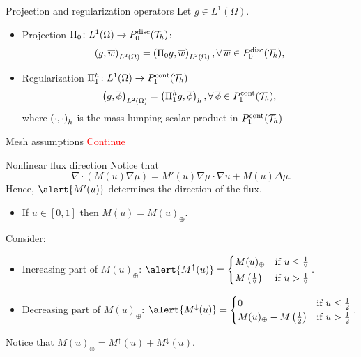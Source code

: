 \begin{frame}{Projection and regularization operators}
	Let $g\in L^1(\Omega)$.

	\begin{itemize}
		\item Projection $\Pi_0\colon L^1(\Omega) \rightarrow \relax{P}^{\text{disc}}_0(\mathcal{T}_h)$:
		\begin{equation*}
			\left(g,\overline{w}\right)_{L^2(\Omega)}=
			\left(\Pi_0 g,\overline{w}\right)_{L^2(\Omega)},\forall\,\overline{w}\in \relax{P}^{\text{disc}}_0(\mathcal{T}_h),
		\end{equation*}
		\item Regularization $\Pi^h_1\colon L^1(\Omega)\rightarrow \relax{P}^{\text{cont}}_1(\mathcal{T}_h)$
		\begin{equation*}
			\left(g,\overline{\phi}\right)_{L^2(\Omega)}=\left(\Pi^h_1 g,\overline{\phi}\right)_h,\forall\,\overline{\phi}\in \relax{P}^{\text{cont}}_1(\mathcal{T}_h),
		\end{equation*}
		where $\left(\cdot,\cdot\right)_h$ is the mass-lumping scalar product in $\relax{P}^{\text{cont}}_1(\mathcal{T}_h)$
	\end{itemize}
\end{frame}

\begin{frame}{Mesh assumptions}
	\textcolor{red}{Continue}
\end{frame}

\begin{frame}{Nonlinear flux direction}
	\footnotesize
	Notice that
	$$\nabla\cdot(M(u)\nabla\mu)=M'(u)\nabla\mu \cdot\nabla u+M(u)\Delta\mu.$$
	Hence, $\alert{M'(u)}$ determines the direction of the flux.
	
	\vspace*{0.3cm}
	\begin{itemize}
		\item If $u\in[0,1]$ then $M(u)=M(u)_\oplus$.
	\end{itemize}
	\vspace*{0.3cm}
	
	Consider:
	\begin{itemize}
		\item Increasing part of $M(u)_\oplus$: $\alert{M^\uparrow(u)}=
		\begin{cases}
			M(u)_{\oplus} & \text{if }u\le \frac{1}{2}\\[0.2em]
			M\left(\frac{1}{2}\right) & \text{if } u>\frac{1}{2}
		\end{cases}.$
		\item Decreasing part of $M(u)_\oplus$: $
		\alert{M^\downarrow(u)}=
		\begin{cases}
			0 & \text{if }u\le \frac{1}{2}\\
			M(u)_{\oplus}-M\left(\frac{1}{2}\right) & \text{if } u>\frac{1}{2}
		\end{cases}.$
	\end{itemize}
	Notice that $M(u)_\oplus=M^\uparrow(u)+M^\downarrow(u)$.
\end{frame}

